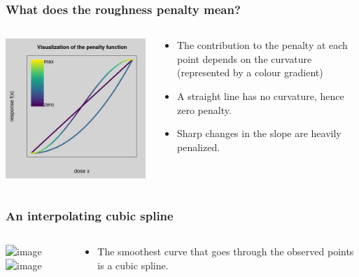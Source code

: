 \documentclass[aspectratio=169]{beamer}
\begin{document}
\begin{frame}
  \frametitle{What does the roughness penalty mean?}

   \begin{columns}
    \begin{column}{5cm}
      \includegraphics[scale=0.4]{figures/penalty2.png}
    \end{column}
    \begin{column}{4cm}
      \begin{itemize}
      \item The contribution to the penalty at each point depends on the
        curvature (represented by a colour gradient)
      \item A straight line has no curvature, hence zero penalty.
      \item Sharp changes in the slope are heavily penalized.
      \end{itemize}
    \end{column}
  \end{columns}

\end{frame}
    
\begin{frame}
  \frametitle{An interpolating cubic spline}

    \begin{columns}
    \begin{column}{5cm}
      \includegraphics<1>[scale=0.4]{figures/dose-response-points.png}
      \includegraphics<2>[scale=0.4]{figures/dose-response-cubic.png}
    \end{column}
    \begin{column}{4cm}
      \begin{itemize}
        \item The smoothest curve that goes through the observed
          points is a cubic spline.
      \end{itemize}
    \end{column}
  \end{columns}

\end{frame}
\end{document}
